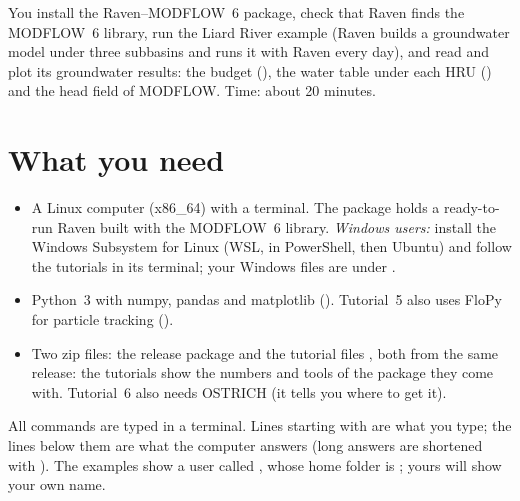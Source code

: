 
\begin{goal}
You install the Raven--MODFLOW~6 package, check that Raven finds the MODFLOW~6 library, run the Liard River example (Raven
builds a groundwater model under three subbasins and runs it with Raven every day), and read and plot its groundwater
results: the budget (), the water table under each HRU () and the head field of
MODFLOW. Time: about 20 minutes.
\end{goal}

\section{What you need}
\begin{itemize}
\item A Linux computer (x86\_64) with a terminal. The package holds a ready-to-run Raven built with the MODFLOW~6 library.
      \emph{Windows users:} install the Windows Subsystem for Linux (WSL,  in PowerShell, then Ubuntu)
      and follow the tutorials in its terminal; your Windows files are under .
\item Python~3 with numpy, pandas and matplotlib (). Tutorial~5 also uses
      FloPy for particle tracking ().
\item Two zip files: the release package  and the tutorial files
      , both from the same release: the tutorials show the numbers and tools of the
      package they come with. Tutorial~6 also needs OSTRICH (it tells you where to get it).
\end{itemize}
All commands are typed in a terminal. Lines starting with \cmd{\$} are what you type; the lines below them are what the
computer answers (long answers are shortened with ). The examples show a user called , whose home
folder is ; yours will show your own name.

